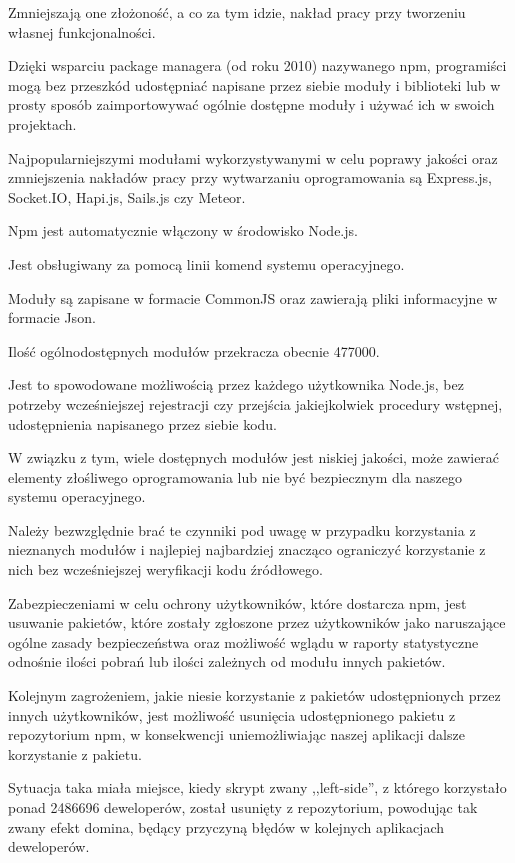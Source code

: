\documentclass[12pt]{report}
\begin{document}
Zmniejszają one złożoność, a co za tym idzie, nakład pracy przy tworzeniu własnej funkcjonalności.

Dzięki wsparciu package managera (od roku 2010) nazywanego npm, programiści mogą bez przeszkód udostępniać napisane przez siebie moduły i biblioteki lub w prosty sposób zaimportowywać ogólnie dostępne moduły i używać ich w swoich projektach.

Najpopularniejszymi modułami wykorzystywanymi w celu poprawy jakości oraz zmniejszenia nakładów pracy przy wytwarzaniu oprogramowania są Express.js, Socket.IO, Hapi.js, Sails.js czy Meteor.

Npm jest automatycznie włączony w środowisko Node.js.

Jest obsługiwany za pomocą linii komend systemu operacyjnego.

Moduły są zapisane w formacie CommonJS oraz zawierają pliki informacyjne w formacie Json.

Ilość ogólnodostępnych modułów przekracza obecnie 477000.

Jest to spowodowane możliwością przez każdego użytkownika Node.js, bez potrzeby wcześniejszej rejestracji czy przejścia jakiejkolwiek procedury wstępnej, udostępnienia napisanego przez siebie kodu.

W związku z tym, wiele dostępnych modułów jest niskiej jakości, może zawierać elementy złośliwego oprogramowania lub nie być bezpiecznym dla naszego systemu operacyjnego.

Należy bezwzględnie brać te czynniki pod uwagę w przypadku korzystania z nieznanych modułów i najlepiej najbardziej znacząco ograniczyć korzystanie z nich bez wcześniejszej weryfikacji kodu źródłowego.

Zabezpieczeniami w celu ochrony użytkowników, które dostarcza npm, jest usuwanie pakietów, które zostały zgłoszone przez użytkowników jako naruszające ogólne zasady bezpieczeństwa oraz możliwość wglądu w raporty statystyczne odnośnie ilości pobrań lub ilości zależnych od modułu innych pakietów.

Kolejnym zagrożeniem, jakie niesie korzystanie z pakietów udostępnionych przez innych użytkowników, jest możliwość usunięcia udostępnionego pakietu z repozytorium npm, w konsekwencji uniemożliwiając naszej aplikacji dalsze korzystanie z pakietu.

Sytuacja taka miała miejsce, kiedy skrypt zwany ,,left-side'', z którego korzystało ponad 2486696 deweloperów, został usunięty z repozytorium, powodując tak zwany efekt domina, będący przyczyną błędów w kolejnych aplikacjach deweloperów.
\end{document}
